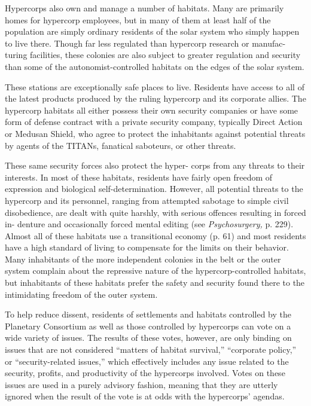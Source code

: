 Hypercorps also own and manage a number of 
habitats. Many are primarily homes for hypercorp 
employees, but in many of them at least half of the 
population are simply ordinary residents of the solar 
system who simply happen to live there. Though far 
less regulated than hypercorp research or manufac-
turing facilities, these colonies are also subject to 
greater regulation and security than some of the 
autonomist-controlled habitats on the edges of the 
solar system. 

These stations are exceptionally safe places to live. 
Residents have access to all of the latest products 
produced by the ruling hypercorp and its corporate 
allies. The hypercorp habitats all either possess 
their own security companies or have some form 
of defense contract with a private security company, 
typically Direct Action or Medusan Shield, who 
agree to protect the inhabitants against potential 
threats by agents of the TITANs, fanatical saboteurs, 
or other threats.

These same security forces also protect the hyper-
corps from any threats to their interests. In most of 
these habitats, residents have fairly open freedom 
of expression and biological self-determination. 
However, all potential threats to the hypercorp and 
its personnel, ranging from attempted sabotage 
to simple civil disobedience, are dealt with quite 
harshly, with serious offences resulting in forced in-
denture and occasionally forced mental editing (see 
\textit{Psychosurgery, }p. 229). Almost all of these habitats 
use a transitional economy (p. 61) and most residents 
have a high standard of living to compensate for the 
limits on their behavior. Many inhabitants of the 
more independent colonies in the belt or the outer 
system complain about the repressive nature of the 
hypercorp-controlled habitats, but inhabitants of 
these habitats prefer the safety and security found 
there to the intimidating freedom of the outer system.

To help reduce dissent, residents of settlements and 
habitats controlled by the Planetary Consortium as 
well as those controlled by hypercorps can vote on 
a wide variety of issues. The results of these votes, 
however, are only binding on issues that are not 
considered ``matters of habitat survival,'' ``corporate 
policy,'' or ``security-related issues,'' which effectively 
includes any issue related to the security, profits, and 
productivity of the hypercorps involved. Votes on 
these issues are used in a purely advisory fashion, 
meaning that they are utterly ignored when the result 
of the vote is at odds with the hypercorps' agendas.

